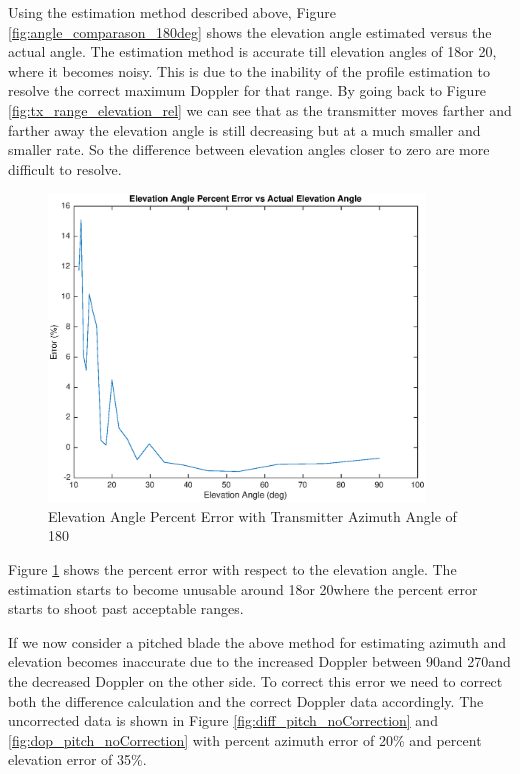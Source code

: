 Using the estimation method described above, Figure \ref{fig:angle_comparason_180deg} shows the elevation angle estimated versus the actual angle. The estimation method is accurate till elevation angles of 18\textdegree \space or 20\textdegree, where it becomes noisy. This is due to the inability of the profile estimation to resolve the correct maximum Doppler for that range. By going back to Figure \ref{fig:tx_range_elevation_rel} we can see that as the transmitter moves farther and farther away the elevation angle is still decreasing but at a much smaller and smaller rate. So the difference between elevation angles closer to zero are more difficult to resolve. 

\begin{figure}
	\begin{center}
		\includegraphics[width=10cm]{images/results/Elevation_angle_percent_error_180deg_Azimuth.eps}
		\caption{Elevation Angle Percent Error with Transmitter Azimuth Angle of 180\textdegree}
		\label{fig:percent_error_elevation_180deg}
	\end{center}
\end{figure}

Figure \ref{fig:percent_error_elevation_180deg} shows the percent error with respect to the elevation angle. The estimation starts to become unusable around 18\textdegree \space or 20\textdegree \space where the percent error starts to shoot past acceptable ranges.


If we now consider a pitched blade the above method for estimating azimuth and elevation becomes inaccurate due to the increased Doppler between 90\textdegree \space and 270\textdegree \space and the decreased Doppler on the other side. To correct this error we need to correct both the difference calculation and the correct Doppler data accordingly. The uncorrected data is shown in Figure \ref{fig:diff_pitch_noCorrection} and \ref{fig:dop_pitch_noCorrection} with percent azimuth error of 20\% and percent elevation error of 35\%.

